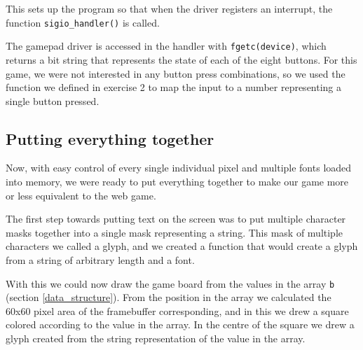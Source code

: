 

This sets up the program so that when the driver registers an interrupt, the function \texttt{sigio\_handler()} is called.


The gamepad driver is accessed in the handler with \texttt{fgetc(device)}, which returns a bit string that represents the state of each of the eight buttons.
For this game, we were not interested in any button press combinations, so we used the function we defined in exercise 2 to map the input to a number representing a single button pressed.



\newpage


\newpage


\newpage
\subsection{Putting everything together}
Now, with easy control of every single individual pixel and multiple fonts loaded into memory, we were ready to put everything together to make our game more or less equivalent to the web game.

The first step towards putting text on the screen was to put multiple character masks together into a single mask representing a string.
This mask of multiple characters we called a glyph, and we created a function that would create a glyph from a string of arbitrary length and a font.



With this we could now draw the game board from the values in the array \texttt{b} (section \ref{data_structure}).
From the position in the array we calculated the 60x60 pixel area of the framebuffer corresponding, and in this we drew a square colored according to the value in the array.
In the centre of the square we drew a glyph created from the string representation of the value in the array.


